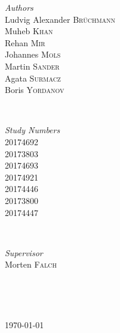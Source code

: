 \documentclass[12p]{article}
\begin{document}
\begin{titlepage}
	\begin{minipage}{0.4\textwidth}
  \begin{flushleft} \large
  \emph{Authors}\\
    Ludvig Alexander \textsc{Brüchmann} \\
    Muheb \textsc{Khan} \\
  	Rehan \textsc{Mir} \\
  	Johannes \textsc{Mols} \\
  	Martin \textsc{Sander} \\
  	Agata \textsc{Surmacz} \\
  	Boris \textsc{Yordanov} \\
  \end{flushleft}
  \end{minipage}
  ~
  \begin{minipage}{0.4\textwidth}
  \begin{flushright} \large
  \emph{Study Numbers} \\
    20174692 \\
    20173803 \\
    20174693 \\
    20174921 \\
    20174446 \\
    20173800 \\
    20174447 \\
  \end{flushright}
  \end{minipage}\\[0.5cm]
  
  
  \begin{minipage}{0.4\textwidth}
  \begin{flushleft} \large
  \emph{Supervisor}\\
    Morten \textsc{Falch} \\
  \end{flushleft}
  \end{minipage}
  ~
  \begin{minipage}{0.4\textwidth}
  \begin{flushright} \large
  \end{flushright}
  \end{minipage}\\[0.5cm]

	
	\vfill\vfill\vfill %
	
	{\large\today} %
	
  
\end{titlepage}
\end{document}
